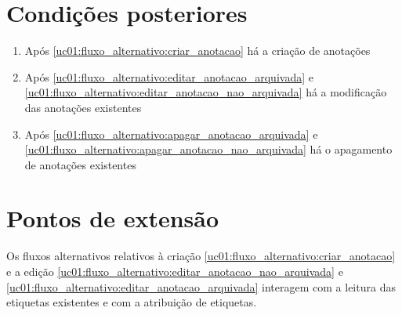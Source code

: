 \documentclass[
	12pt,				%
	oneside,			%
	a4paper,			%
	english,			%
	brazil,				%
	]{abntex2}
\begin{document}



\section{Condições posteriores}
\begin{enumerate}
    \item Após \ref{uc01:fluxo_alternativo:criar_anotacao} há a criação de anotações
    \item Após \ref{uc01:fluxo_alternativo:editar_anotacao_arquivada} e \ref{uc01:fluxo_alternativo:editar_anotacao_nao_arquivada} há a modificação das anotações existentes
    \item Após \ref{uc01:fluxo_alternativo:apagar_anotacao_arquivada} e \ref{uc01:fluxo_alternativo:apagar_anotacao_nao_arquivada} há o apagamento de anotações existentes
\end{enumerate}

\section{Pontos de extensão}
Os fluxos alternativos relativos à criação \ref{uc01:fluxo_alternativo:criar_anotacao} e a edição \ref{uc01:fluxo_alternativo:editar_anotacao_nao_arquivada} e \ref{uc01:fluxo_alternativo:editar_anotacao_arquivada} interagem com a leitura das etiquetas existentes e com a atribuição de etiquetas.



\end{document}
